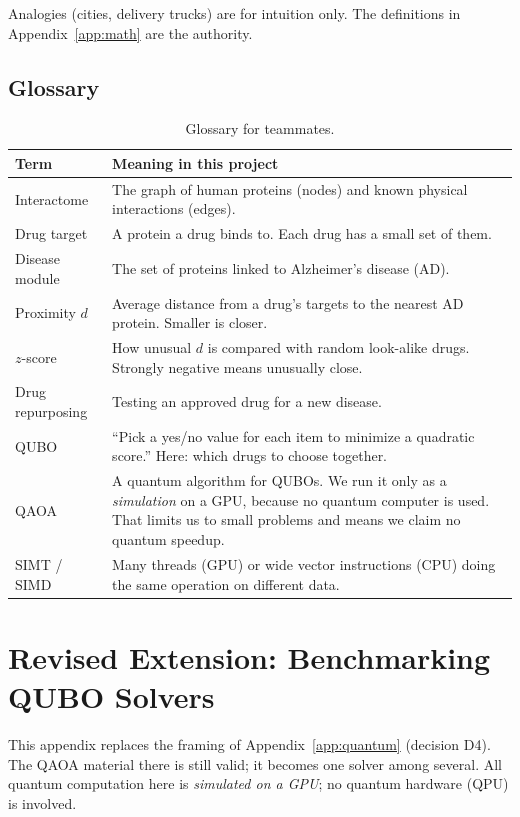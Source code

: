 Analogies (cities, delivery trucks) are for intuition only. The definitions
in Appendix~\ref{app:math} are the authority.

\subsection{Glossary}
\label{sec:glossary}

\begin{table}[!ht]
\centering
\small
\begin{tabularx}{\linewidth}{@{}l>{\raggedright\arraybackslash}X@{}}
\toprule
Term & Meaning in this project \\
\midrule
Interactome & The graph of human proteins (nodes) and known physical interactions (edges). \\
Drug target & A protein a drug binds to. Each drug has a small set of them. \\
Disease module & The set of proteins linked to Alzheimer's disease (AD). \\
Proximity $d$ & Average distance from a drug's targets to the nearest AD protein. Smaller is closer. \\
$z$-score & How unusual $d$ is compared with random look-alike drugs. Strongly negative means unusually close. \\
Drug repurposing & Testing an approved drug for a new disease. \\
QUBO & ``Pick a yes/no value for each item to minimize a quadratic score.'' Here: which drugs to choose together. \\
QAOA & A quantum algorithm for QUBOs. We run it only as a \emph{simulation} on a GPU, because no quantum computer is used. That limits us to small problems and means we claim no quantum speedup. \\
SIMT / SIMD & Many threads (GPU) or wide vector instructions (CPU) doing the same operation on different data. \\
\bottomrule
\end{tabularx}
\caption{Glossary for teammates.}
\end{table}

\section{Revised Extension: Benchmarking QUBO Solvers}
\label{app:extension}

This appendix replaces the framing of Appendix~\ref{app:quantum} (decision D4).
The QAOA material there is still valid; it becomes one solver among several.
All quantum computation here is \emph{simulated on a GPU}; no quantum hardware
(QPU) is involved.


